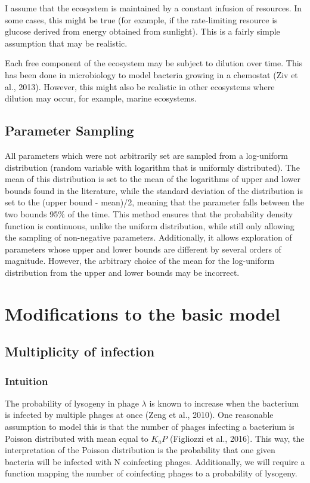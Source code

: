 \documentclass{article}
\begin{document}
I assume that the ecosystem is maintained by a constant infusion of resources. In some cases, this might be true (for example, if the rate-limiting resource is glucose derived from energy obtained from sunlight). This is a fairly simple assumption that may be realistic. 

Each free component of the ecosystem may be subject to dilution over time. This has been done in microbiology to model bacteria growing in a chemostat (Ziv et al., 2013). However, this might also be realistic in other ecosystems where dilution may occur, for example, marine ecosystems. 

\subsection{Parameter Sampling}

All parameters which were not arbitrarily set are sampled from a log-uniform distribution (random variable with logarithm that is uniformly distributed). The mean of this distribution is set to the mean of the logarithms of upper and lower bounds found in the literature, while the standard deviation of the distribution is set to the (upper bound - mean)/2, meaning that the parameter falls between the two bounds 95$\%$ of the time. This method ensures that the probability density function is continuous, unlike the uniform distribution, while still only allowing the sampling of non-negative parameters. Additionally, it allows exploration of parameters whose upper and lower bounds are different by several orders of magnitude. However, the arbitrary choice of the mean for the log-uniform distribution from the upper and lower bounds may be incorrect.

\section{Modifications to the basic model}
\subsection{Multiplicity of infection}
\subsubsection{Intuition}
The probability of lysogeny in phage $\lambda$ is known to increase when the bacterium is infected by multiple phages at once (Zeng et al., 2010). One reasonable assumption to model this is that the number of phages infecting a bacterium is Poisson distributed with mean equal to $K_aP$ (Figliozzi et al., 2016). This way, the interpretation of the Poisson distribution is the probability that one given bacteria will be infected with N coinfecting phages. Additionally, we will require a function mapping the number of coinfecting phages to a probability of lysogeny.
\end{document}
